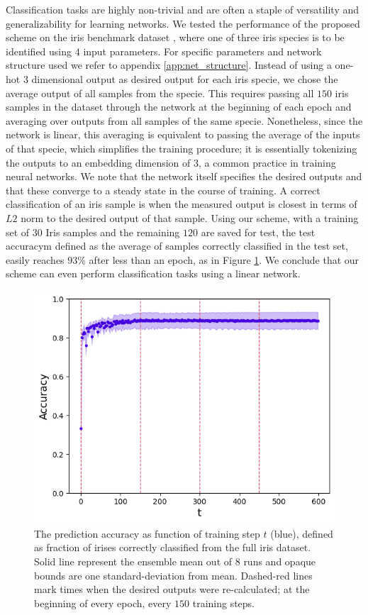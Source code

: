 \documentclass[%
 reprint,
 amsmath,amssymb,
 aps,
]{revtex4-2}
\begin{document}
    Classification tasks are highly non-trivial and are often a staple of versatility and generalizability for learning networks. We tested the performance of the proposed scheme on the iris benchmark dataset \cite{fisher1936use}, where one of three iris species is to be identified using $4$ input parameters. For specific parameters and network structure used we refer to appendix \ref{app:net_structure}. 
    Instead of using a one-hot $3$ dimensional output as desired output for each iris specie, we chose the average output of all samples from the specie. This requires passing all $150$ iris samples in the dataset through the network at the beginning of each epoch and averaging over outputs from all samples of the same specie. Nonetheless, since the network is linear, this averaging is equivalent to passing the average of the inputs of that specie, which simplifies the training procedure; it is essentially tokenizing the outputs to an embedding dimension of $3$, a common practice in training neural networks. We note that the network itself specifies the desired outputs and that these converge to a steady state in the course of training. A correct classification of an iris sample is when the measured output is closest in terms of $L2$ norm to the desired output of that sample. Using our scheme, with a training set of $30$ Iris samples and the remaining $120$ are saved for test, the test accuracym defined as the average of samples correctly classified in the test set, easily reaches $93\%$ after less than an epoch, as in Figure \ref{fig:accuracy_vs_t}. We conclude that our scheme can even perform classification tasks using a linear network.

    \begin{figure}[ht]
    \centerline{
    \includegraphics[width=\columnwidth]{Figures/accuracy_vs_t_markers.png}
    }
    \caption{The prediction accuracy as function of training step $t$ (blue), defined as fraction of irises correctly classified from the full iris dataset. Solid line represent the ensemble mean out of $8$ runs and opaque bounds are one standard-deviation from mean. Dashed-red lines mark times when the desired outputs were re-calculated; at the beginning of every epoch, every $150$ training steps.}
    \label{fig:accuracy_vs_t}
    \end{figure} 
\end{document}
